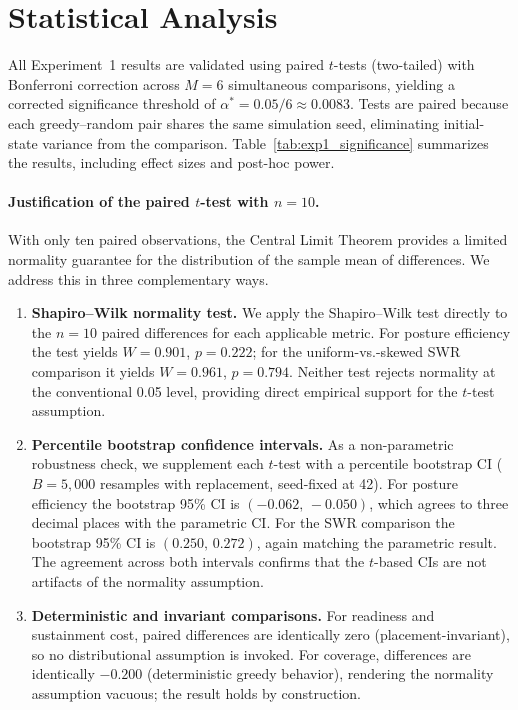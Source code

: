 \documentclass[11pt]{article}
\begin{document}
\section{Statistical Analysis}
\label{sec:stats}

All Experiment~1 results are validated using paired $t$-tests (two-tailed)
with Bonferroni correction across $M = 6$ simultaneous comparisons,
yielding a corrected significance threshold of
$\alpha^* = 0.05 / 6 \approx 0.0083$.
Tests are paired because each greedy--random pair shares the same simulation
seed, eliminating initial-state variance from the comparison.
Table~\ref{tab:exp1_significance} summarizes the results, including
effect sizes and post-hoc power.

\paragraph{Justification of the paired $t$-test with $n = 10$.}
With only ten paired observations, the Central Limit Theorem provides a
limited normality guarantee for the distribution of the sample mean of
differences. We address this in three complementary ways.
\begin{enumerate}
    \item \textbf{Shapiro--Wilk normality test.}
    We apply the Shapiro--Wilk test directly to the $n = 10$ paired
    differences for each applicable metric. For posture efficiency the
    test yields $W = 0.901$, $p = 0.222$; for the uniform-vs.-skewed SWR
    comparison it yields $W = 0.961$, $p = 0.794$. Neither test rejects
    normality at the conventional 0.05 level, providing direct empirical
    support for the $t$-test assumption.
    \item \textbf{Percentile bootstrap confidence intervals.}
    As a non-parametric robustness check, we supplement each $t$-test with
    a percentile bootstrap CI ($B = 5{,}000$ resamples with replacement,
    seed-fixed at 42). For posture efficiency the bootstrap 95\% CI is
    $(-0.062,\,-0.050)$, which agrees to three decimal places with the
    parametric CI. For the SWR comparison the bootstrap 95\% CI is
    $(0.250,\,0.272)$, again matching the parametric result. The
    agreement across both intervals confirms that the $t$-based CIs are
    not artifacts of the normality assumption.
    \item \textbf{Deterministic and invariant comparisons.}
    For readiness and sustainment cost, paired differences are identically
    zero (placement-invariant), so no distributional assumption is invoked.
    For coverage, differences are identically $-0.200$ (deterministic
    greedy behavior), rendering the normality assumption vacuous; the
    result holds by construction.
\end{enumerate}
\end{document}
